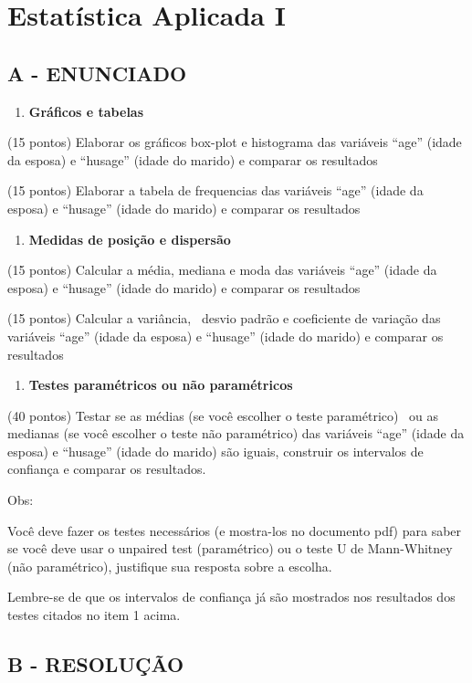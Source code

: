 \label{ap:ap04}
\chapter{Estatística Aplicada I}
\section*{\textbf{A - ENUNCIADO}}
\begin{enumerate}[series=listWWNumxxvi,label=\arabic*),ref=\arabic*]
\item \textbf{Gráficos e tabelas}
\end{enumerate}

\bigskip

(15 pontos) Elaborar os gráficos box-plot e histograma das variáveis “age” (idade da esposa) e “husage” (idade do
marido) e comparar os resultados

(15 pontos) Elaborar a tabela de frequencias das variáveis “age” (idade da esposa) e “husage” (idade do marido) e
comparar os resultados


\bigskip

\begin{enumerate}[resume*=listWWNumxxvi]
\item \textbf{Medidas de posição e dispersão}
\end{enumerate}

\bigskip

(15 pontos) Calcular a média, mediana e moda das variáveis “age” (idade da esposa) e “husage” (idade do marido) e
comparar os resultados

(15 pontos) Calcular a variância, \ desvio padrão e coeficiente de variação das variáveis “age” (idade da esposa) e
“husage” (idade do marido) e comparar os resultados


\bigskip

\begin{enumerate}[resume*=listWWNumxxvi]
\item \textbf{Testes paramétricos ou não paramétricos}
\end{enumerate}

\bigskip

(40 pontos) Testar se as médias (se você escolher o teste paramétrico) \ ou as medianas (se você escolher o teste não
paramétrico) das variáveis “age” (idade da esposa) e “husage” (idade do marido) são iguais, construir os intervalos de
confiança e comparar os resultados.

Obs: 

Você deve fazer os testes necessários (e mostra-los no documento pdf) para saber se você deve usar o unpaired test
(paramétrico) ou o teste U de Mann-Whitney (não paramétrico), justifique sua resposta sobre a escolha.

Lembre-se de que os intervalos de confiança já são mostrados nos resultados dos testes citados no item 1 acima. 


\section*{\textbf{B - RESOLUÇÃO}}
\lipsum[30]